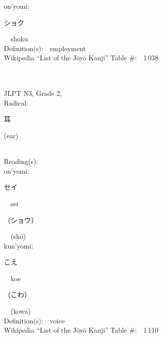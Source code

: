\begin{multicols}{2}
{\hspace*{1em}}on'yomi:\ \ \\
{\hspace*{2em}}{\begin{CJK}{UTF8}{min} ショク \end{CJK}}\ \ shoku\ \ \\
Definition(s):\ \ employment \\
Wikipedia ``List of the J\=oy\=o Kanji'' Table \#:\ \ 1\,038 \\
\ \ \\
{\fontsize{34pt}{40pt}  }\ \ \\  %
{JLPT N3, Grade 2, \\Radical:\ \ {\begin{CJK}{UTF8}{min} 耳 \end{CJK}} (ear) } \\
Reading(s):\ \ \\
{\hspace*{1em}}on'yomi:\ \ \\
{\hspace*{2em}}{\begin{CJK}{UTF8}{min} セイ \end{CJK}}\ \ sei\ \ \\
{\hspace*{2em}}{\begin{CJK}{UTF8}{min} （ショウ） \end{CJK}}\ \ (sh\=o)\ \ \\
{\hspace*{1em}}kun'yomi:\ \ \\
{\hspace*{2em}}{\begin{CJK}{UTF8}{min} こえ \end{CJK}}\ \ koe\ \ \\
{\hspace*{2em}}{\begin{CJK}{UTF8}{min} （こわ） \end{CJK}}\ \ (kowa)\ \ \\
Definition(s):\ \ voice \\
Wikipedia ``List of the J\=oy\=o Kanji'' Table \#:\ \ 1\,110 \\
\ \ \\
{\fontsize{34pt}{40pt}  }\ \ \\  %

\end{multicols}
